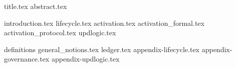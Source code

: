 \documentclass{llncs}
\begin{document}
{title.tex}
{abstract.tex}

{introduction.tex}
{lifecycle.tex}
{activation.tex}
{activation_formal.tex}
{activation_protocol.tex}
{updlogic.tex}


\appendix
{definitions}
{general_notions.tex}
{ledger.tex}
{appendix-lifecycle.tex}
{appendix-governance.tex}
{appendix-updlogic.tex}
\end{document}
